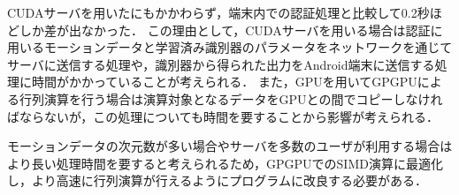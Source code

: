 CUDAサーバを用いたにもかかわらず，端末内での認証処理と比較して0.2秒ほどしか差が出なかった．
この理由として，CUDAサーバを用いる場合は認証に用いるモーションデータと学習済み識別器のパラメータをネットワークを通じてサーバに送信する処理や，識別器から得られた出力をAndroid端末に送信する処理に時間がかかっていることが考えられる．
また，GPUを用いてGPGPUによる行列演算を行う場合は演算対象となるデータをGPUとの間でコピーしなければならないが，この処理についても時間を要することから影響が考えられる．

モーションデータの次元数が多い場合やサーバを多数のユーザが利用する場合はより長い処理時間を要すると考えられるため，GPGPUでのSIMD演算に最適化し，より高速に行列演算が行えるようにプログラムに改良する必要がある．

